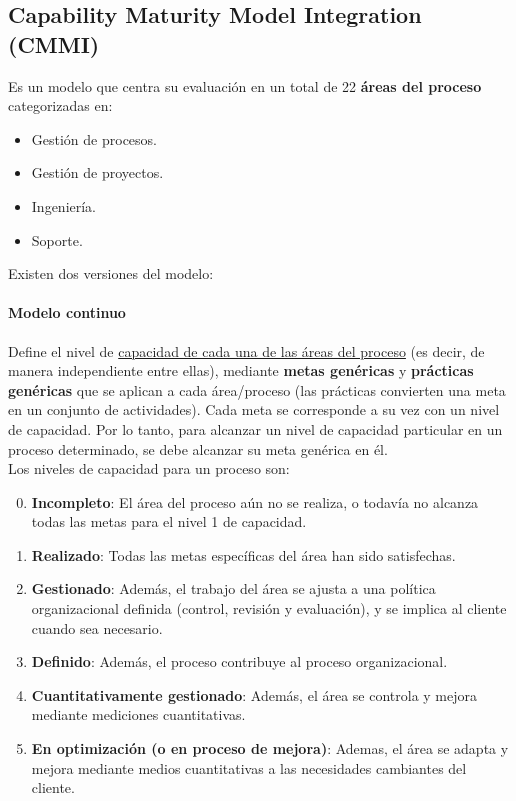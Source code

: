 \subsection{Capability Maturity Model Integration (CMMI)}

Es un modelo que centra su evaluación en un total de 22 \textbf{áreas del proceso} categorizadas en:

\begin{itemize}
    \item Gestión de procesos.
    \item Gestión de proyectos.
    \item Ingeniería.
    \item Soporte.
\end{itemize}

Existen dos versiones del modelo:

\paragraph{Modelo continuo} Define el nivel de \uline{capacidad de cada una de las áreas del proceso} (es decir, de manera independiente entre ellas), mediante \textbf{metas genéricas} y \textbf{prácticas genéricas} que se aplican a cada área/proceso (las prácticas convierten una meta en un conjunto de actividades). Cada meta se corresponde a su vez con un nivel de capacidad. Por lo tanto, para alcanzar un nivel de capacidad particular en un proceso determinado, se debe alcanzar su meta genérica en él.\\

Los niveles de capacidad para un proceso son:

\begin{enumerate}
    \setcounter{enumi}{-1}
    \item \textbf{Incompleto}: El área del proceso aún no se realiza, o todavía no alcanza todas las metas para el nivel 1 de capacidad.
    \item \textbf{Realizado}: Todas las metas específicas del área han sido satisfechas.
    \item \textbf{Gestionado}: Además, el trabajo del área se ajusta a una política organizacional definida (control, revisión y evaluación), y se implica al cliente cuando sea necesario.
    \item \textbf{Definido}: Además, el proceso contribuye al proceso organizacional.
    \item \textbf{Cuantitativamente gestionado}: Además, el área se controla y mejora mediante mediciones cuantitativas.
    \item \textbf{En optimización (o en proceso de mejora)}: Ademas, el área se adapta y mejora mediante medios cuantitativas a las necesidades cambiantes del cliente.
\end{enumerate}

